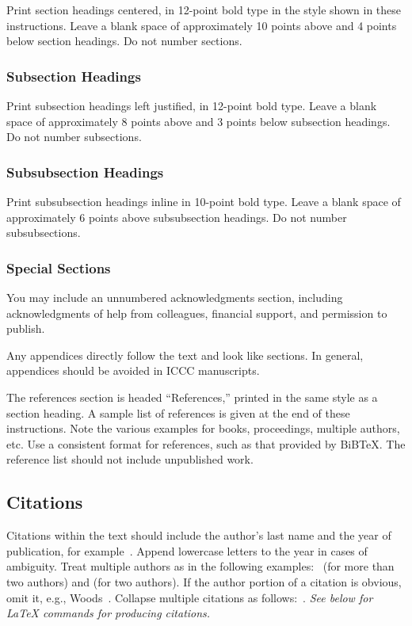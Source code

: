 \documentclass[letterpaper]{article}
\begin{document}
Print section headings centered, in 12-point bold type in the style shown in
these instructions. Leave a blank space of approximately 10 points
above and 4 points below section headings.  Do not number sections.

\subsubsection{Subsection Headings}

Print subsection headings left justified, in 12-point bold type. Leave a blank space
of approximately 8 points above and 3 points below subsection
headings. Do not number subsections.

\subsubsection{Subsubsection Headings}

Print subsubsection headings inline in 10-point bold type. Leave a blank
space of approximately 6 points above subsubsection headings. Do not
number subsubsections.

\subsubsection{Special Sections}

You may include an unnumbered acknowledgments section, including
acknowledgments of help from colleagues, financial support, and
permission to publish.

Any appendices directly follow the text and look like sections.  In general, appendices should 
be avoided in ICCC manuscripts.

The references section is headed ``References,'' printed in the same
style as a section heading. A sample list of
references is given at the end of these instructions.  Note the various examples for books, proceedings, multiple authors, etc. Use a consistent
format for references, such as that provided by BiB\TeX{}. The reference
list should not include unpublished work.

\subsection{Citations}

Citations within the text should include the author's last name and
the year of publication, for example~\cite{boden92}.  Append
lowercase letters to the year in cases of ambiguity.  Treat multiple
authors as in the following examples:~\cite{lyu04}
(for more than two authors) and
\cite{veale07} (for two authors).  If the author
portion of a citation is obvious, omit it, e.g.,
Woods~.  Collapse multiple citations as
follows:~\cite{UCI,Ruch07,OZ}.
\emph{See below for \LaTeX{} commands for producing citations.}
\end{document}
